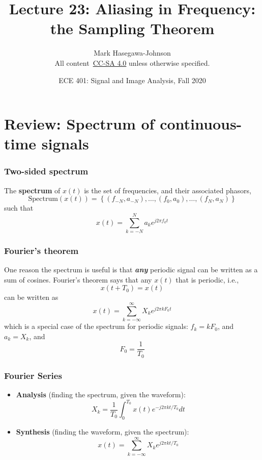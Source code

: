 \documentclass{beamer}
\title{Lecture 23: Aliasing in Frequency: the Sampling Theorem}
\author{Mark Hasegawa-Johnson\\All content~\href{https://creativecommons.org/licenses/by-sa/4.0/}{CC-SA 4.0} unless otherwise specified.}
\date{ECE 401: Signal and Image Analysis, Fall 2020}
\begin{document}
\begin{frame}
  \maketitle
\end{frame}

\begin{frame}
  \tableofcontents
\end{frame}

\section[Review]{Review: Spectrum of continuous-time signals}
\setcounter{subsection}{1}

\begin{frame}
  \frametitle{Two-sided spectrum}

  The {\bf spectrum} of $x(t)$ is the set of frequencies, and their
  associated phasors,
  \[
  \mbox{Spectrum}\left( x(t) \right) =
  \left\{ (f_{-N},a_{-N}), \ldots, (f_0,a_0), \ldots, (f_N,a_N) \right\}
  \]
  such that
  \[
  x(t) = \sum_{k=-N}^N a_ke^{j2\pi f_kt}
  \]
\end{frame}

\begin{frame}
  \frametitle{Fourier's theorem}

  One reason the spectrum is useful is that {\bf\em any} periodic
  signal can be written as a sum of cosines.  Fourier's theorem says that
  any $x(t)$ that is periodic, i.e.,
  \[
  x(t+T_0) = x(t)
  \]
  can be written as
  \[
  x(t) = \sum_{k=-\infty}^\infty X_k e^{j2\pi k F_0 t}
  \]
  which is a special case of the spectrum for periodic signals:
  $f_k=kF_0$, and $a_k=X_k$, and
  \[
  F_0 = \frac{1}{T_0}
  \]
\end{frame}

\begin{frame}
  \frametitle{Fourier Series}

  \begin{itemize}
  \item {\bf Analysis}  (finding the spectrum, given the waveform):
    \[
    X_k = \frac{1}{T_0}\int_0^{T_0} x(t)e^{-j2\pi kt/T_0}dt
    \]
  \item {\bf Synthesis} (finding the waveform, given the spectrum):
    \[
    x(t) = \sum_{k=-\infty}^\infty X_k e^{j2\pi kt/T_0}
    \]
  \end{itemize}
\end{frame}  
\end{document}
